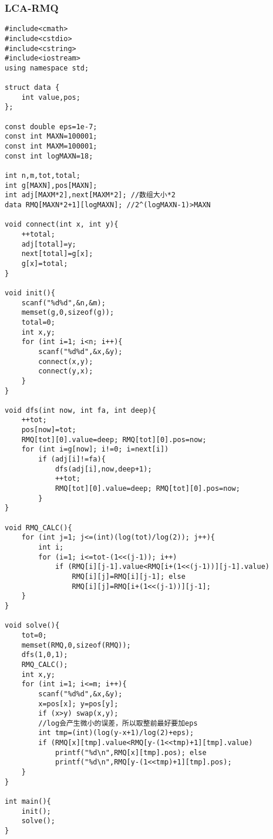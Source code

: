 \subsubsection{LCA-RMQ}
\begin{verbatim}
#include<cmath>
#include<cstdio>
#include<cstring>
#include<iostream>
using namespace std;

struct data {
    int value,pos;
};

const double eps=1e-7;
const int MAXN=100001;
const int MAXM=100001;
const int logMAXN=18;

int n,m,tot,total;
int g[MAXN],pos[MAXN];
int adj[MAXM*2],next[MAXM*2]; //数组大小*2
data RMQ[MAXN*2+1][logMAXN]; //2^(logMAXN-1)>MAXN

void connect(int x, int y){
    ++total;
    adj[total]=y;
    next[total]=g[x];
    g[x]=total;
}

void init(){
    scanf("%d%d",&n,&m);
    memset(g,0,sizeof(g));
    total=0;
    int x,y;
    for (int i=1; i<n; i++){
        scanf("%d%d",&x,&y);
        connect(x,y);
        connect(y,x);
    }
}

void dfs(int now, int fa, int deep){
    ++tot;
    pos[now]=tot;
    RMQ[tot][0].value=deep; RMQ[tot][0].pos=now;
    for (int i=g[now]; i!=0; i=next[i])
        if (adj[i]!=fa){
            dfs(adj[i],now,deep+1);
            ++tot;
            RMQ[tot][0].value=deep; RMQ[tot][0].pos=now;
        }
}

void RMQ_CALC(){
    for (int j=1; j<=(int)(log(tot)/log(2)); j++){
        int i;
        for (i=1; i<=tot-(1<<(j-1)); i++)
            if (RMQ[i][j-1].value<RMQ[i+(1<<(j-1))][j-1].value)
                RMQ[i][j]=RMQ[i][j-1]; else
                RMQ[i][j]=RMQ[i+(1<<(j-1))][j-1];
    }
}

void solve(){
    tot=0;
    memset(RMQ,0,sizeof(RMQ));
    dfs(1,0,1);
    RMQ_CALC();
    int x,y;
    for (int i=1; i<=m; i++){
        scanf("%d%d",&x,&y);
        x=pos[x]; y=pos[y];
        if (x>y) swap(x,y);
        //log会产生微小的误差，所以取整前最好要加eps
        int tmp=(int)(log(y-x+1)/log(2)+eps);
        if (RMQ[x][tmp].value<RMQ[y-(1<<tmp)+1][tmp].value)
            printf("%d\n",RMQ[x][tmp].pos); else
            printf("%d\n",RMQ[y-(1<<tmp)+1][tmp].pos);
    }
}

int main(){
    init();
    solve();
}
\end{verbatim} 
